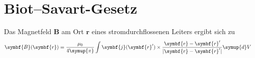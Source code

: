 \documentclass{scrartcl} %
\begin{document}
    \section{Biot--Savart-Gesetz}
    Das Magnetfeld $\symbf{B}$ am Ort
    $\symbf{r}$ eines stromdurchflossenen
    Leiters ergibt sich zu
    \begin{equation}
        \symbf{B}(\symbf{r}) = \frac{\mu_0}{4 \symup{\pi}} \int \symbf{j}(\symbf{r}') \times \frac{\symbf{r}-\symbf{r}'}{\lvert \symbf{r}- \symbf{r}'\rvert}\symup{d}V
    \end{equation}
\end{document}

